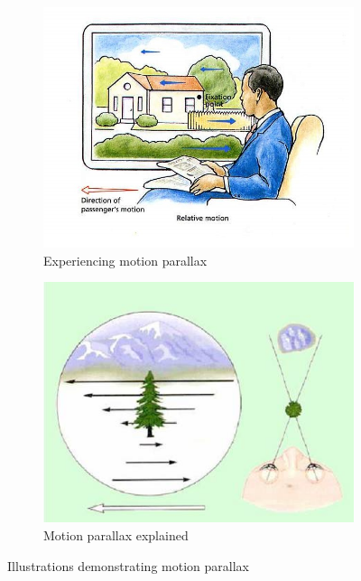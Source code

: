 \begin{figure}[h!]
	\centering
	\begin{subfigure}[h!]{0.45\textwidth}
		\includegraphics[width=\textwidth]{figures/cue8.jpg}
		\caption{Experiencing motion parallax \cite{Parallax0}}\label{fig:cue8}
	\end{subfigure}
	\begin{subfigure}[h!]{0.45\textwidth}
		\includegraphics[width=\textwidth]{figures/cue9.jpg}
		\caption{Motion parallax explained \cite{Skybrary}}\label{fig:cue9}
	\end{subfigure}
	\caption{Illustrations demonstrating motion parallax}
\end{figure}


